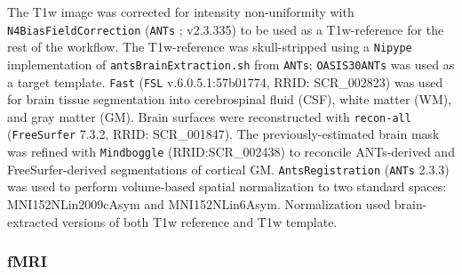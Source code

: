 \documentclass[
true
]{sn-jnl}
\begin{document}
The T1w image was corrected for intensity non-uniformity with
\texttt{N4BiasFieldCorrection} \citep{tustisonN4ITKImprovedN32010}
(\texttt{ANTs} \citep{avantsSymmetricDiffeomorphicImage2008}; v2.3.335)
to be used as a T1w-reference for the rest of the workflow. The
T1w-reference was skull-stripped using a \texttt{Nipype}
\citep{gorgolewskiNipypeFlexibleLightweight2016} implementation of
\texttt{antsBrainExtraction.sh} from \texttt{ANTs}; \texttt{OASIS30ANTs}
was used as a target template. \texttt{Fast}
\citep{zhangSegmentationBrainMR2001} (\texttt{FSL}
\citep{smithAdvancesFunctionalStructural2004} v.6.0.5.1:57b01774, RRID:
SCR\_002823) was used for brain tissue segmentation into cerebrospinal
fluid (CSF), white matter (WM), and gray matter (GM). Brain surfaces
were reconstructed with \texttt{recon-all}
\citep{daleCorticalSurfacebasedAnalysis1999} (\texttt{FreeSurfer}
\citep{daleCorticalSurfacebasedAnalysis1999} 7.3.2, RRID: SCR\_001847).
The previously-estimated brain mask was refined with \texttt{Mindboggle}
\citep{kleinMindbogglingMorphometryHuman2017} (RRID:SCR\_002438) to
reconcile ANTs-derived and FreeSurfer-derived segmentations of cortical
GM. \texttt{AntsRegistration}
\citep{avantsSymmetricDiffeomorphicImage2008} (\texttt{ANTs} 2.3.3) was
used to perform volume-based spatial normalization to two standard
spaces: MNI152NLin2009cAsym and MNI152NLin6Asym. Normalization used
brain-extracted versions of both T1w reference and T1w template.

\subsubsection{fMRI}\label{fmri}
\end{document}
